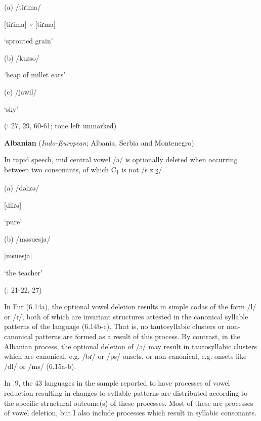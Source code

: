 (a)  /tiɾima/



[tiɾima] {\textasciitilde} [tiɾma]



‘sprouted grain’



(b)  /kuɾso/



‘heap of millet ears’



(c)  /jawil/



‘sky’



(\citealt{Jakobi1990}: 27, 29, 60-61; tone left unmarked)

\z


\ea\label{ex:(6.15)}
   \textbf{Albanian} (\textit{Indo-European}; Albania, Serbia and Montenegro)



  In rapid speech, mid central vowel /ə/ is optionally deleted when occurring between two consonants, of which C\textsubscript{1} is not /s z ʒ/.



(a)  /dəliɾə/



[dliɾə]



‘pure’



(b)  /məsuesja/



[msuesja]



‘the teacher’



(\citealt{Klippenstein2010}: 21-22, 27)

\z


  In Fur (6.14a), the optional vowel deletion results in simple codas of the form /l/ or /ɾ/, both of which are invariant structures attested in the canonical syllable patterns of the language (6.14b-c). That is, no tautosyllabic clusters or non-canonical patterns are formed as a result of this process. By contrast, in the Albanian process, the optional deletion of /ə/ may result in tautosyllabic clusters which are canonical, e.g. /bɾ/ or /ps/ onsets, or non-canonical, e.g. onsets like /dl/ or /ms/ (6.15a-b).



  In .9, the 43 languages in the sample reported to have processes of vowel reduction resulting in changes to syllable patterns are distributed according to the specific structural outcome(s) of these processes. Most of these are processes of vowel deletion, but I also include processes which result in syllabic consonants.






